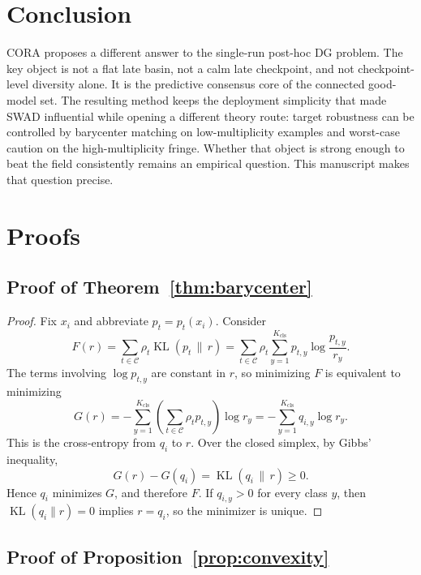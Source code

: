 \documentclass{article}
\newcommand{\cC}{\mathcal{C}}
\newcommand{\KL}{\operatorname{KL}}
\newcommand{\cora}{\textup{\textsc{CORA}}}
\newcommand{\swad}{\textup{\textsc{SWAD}}}
\begin{document}
\section{Conclusion}

\cora{} proposes a different answer to the single-run post-hoc DG problem. The key object is not a flat late basin, not a calm late checkpoint, and not checkpoint-level diversity alone. It is the predictive consensus core of the connected good-model set. The resulting method keeps the deployment simplicity that made \swad{} influential while opening a different theory route: target robustness can be controlled by barycenter matching on low-multiplicity examples and worst-case caution on the high-multiplicity fringe. Whether that object is strong enough to beat the field consistently remains an empirical question. This manuscript makes that question precise.

\newpage
\appendix

\section{Proofs}

\subsection{Proof of Theorem~\ref{thm:barycenter}}

\begin{proof}
Fix $x_i$ and abbreviate $p_t = p_t(x_i)$. Consider
\[
    F(r)
    =
    \sum_{t\in\cC}\rho_t \KL(p_t \,\|\, r)
    =
    \sum_{t\in\cC}\rho_t
    \sum_{y=1}^{K_{\mathrm{cls}}}
    p_{t,y}\log\frac{p_{t,y}}{r_y}.
\]
The terms involving $\log p_{t,y}$ are constant in $r$, so minimizing $F$ is equivalent to minimizing
\[
    G(r)
    =
    - \sum_{y=1}^{K_{\mathrm{cls}}}
    \left(
        \sum_{t\in\cC}\rho_t p_{t,y}
    \right)
    \log r_y
    =
    -\sum_{y=1}^{K_{\mathrm{cls}}} q_{i,y}\log r_y
    .
\]
This is the cross-entropy from $q_i$ to $r$. Over the closed simplex, by Gibbs' inequality,
\[
    G(r) - G(q_i)
    =
    \KL(q_i \,\|\, r)
    \ge 0
    .
\]
Hence $q_i$ minimizes $G$, and therefore $F$. If $q_{i,y}>0$ for every class $y$, then $\KL(q_i\|r)=0$ implies $r=q_i$, so the minimizer is unique.
\end{proof}

\subsection{Proof of Proposition~\ref{prop:convexity}}
\end{document}
